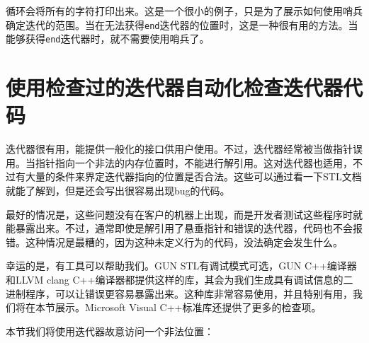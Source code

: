 循环会将所有的字符打印出来。这是一个很小的例子，只是为了展示如何使用哨兵确定迭代的范围。当在无法获得\texttt{end}迭代器的位置时，这是一种很有用的方法。当能够获得\texttt{end}迭代器时，就不需要使用哨兵了。


\section{使用检查过的迭代器自动化检查迭代器代码}

迭代器很有用，能提供一般化的接口供用户使用。不过，迭代器经常被当做指针误用。当指针指向一个非法的内存位置时，不能进行解引用。这对迭代器也适用，不过有大量的条件来界定迭代器指向的位置是否合法。这些可以通过看一下STL文档就能了解到，但是还会写出很容易出现bug的代码。

最好的情况是，这些问题没有在客户的机器上出现，而是开发者测试这些程序时就能暴露出来。不过，通常即使是解引用了悬垂指针和错误的迭代器，代码也不会报错。这种情况是最糟的，因为这种未定义行为的代码，没法确定会发生什么。

幸运的是，有工具可以帮助我们。GUN STL有调试模式可选，GUN C++编译器和LLVM clang C++编译器都提供这样的库，其会为我们生成具有调试信息的二进制程序，可以让错误更容易暴露出来。这种库非常容易使用，并且特别有用，我们将在本节展示。Microsoft Visual C++标准库还提供了更多的检查项。


本节我们将使用迭代器故意访问一个非法位置：

